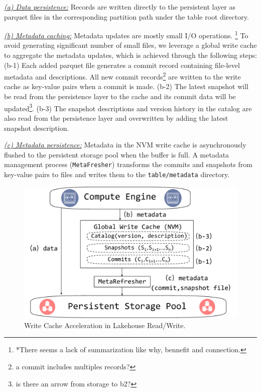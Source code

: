 \noindent \underline{\textit{(a) Data persistence:}} Records are written directly to the persistent layer as parquet files in the corresponding partition path under the table root directory.

\noindent \underline{\textit{(b) Metadata caching:}} Metadata updates are mostly small I/O operations. \footnote{*There seems a lack of summarization like why, bennefit and connection.}
To avoid generating significant number of small files, we leverage a global write cache to aggregate the metadata updates, which is achieved through the following steps:
(b-1) Each added parquet file generates a commit record containing file-level metadata and descriptions. All new commit records\footnote{a commit includes multiples records?} are written to the write cache as key-value pairs when a commit is made.
(b-2) The latest snapshot will be read from the persistence layer to the cache and its commit data will be updated\footnote{is there an arrow from storage to b2?}.
(b-3) The snapshot descriptions and version history in the catalog are also read from the persistence layer and  overwritten by adding the latest snapshot description. 

\noindent \underline{\textit{(c) Metadata persistence:}} Metadata in the NVM write cache is asynchronously flushed to the persistent storage pool when the buffer is full. A metadata management process (\texttt{MetaFresher}) transforms the commits and snapshots from key-value pairs to files and writes them to the \texttt{table/metadata} directory.

\begin{figure}[htbp]
	\includegraphics[scale=0.3]{figures/cache}
	\centering
	\vspace{-1em}
	\caption{Write Cache Acceleration in Lakehouse Read/Write.}
	\label{fig:cache}
	\vspace{-1em}
\end{figure}


